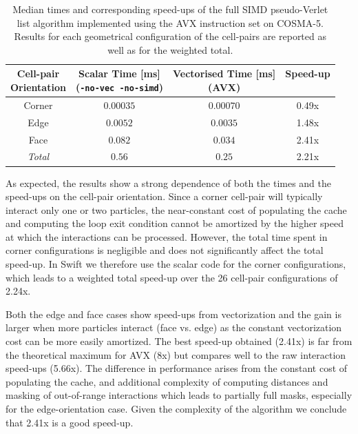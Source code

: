 \documentclass{IOS-Book-Article}
\newcommand{\swift}{{\sc Swift}\xspace}
\begin{document}
\begin{table}[h]
  \caption{Median times and corresponding speed-ups of the full SIMD pseudo-Verlet list algorithm implemented using the AVX instruction set on COSMA-5. Results for each geometrical configuration of the cell-pairs are reported as well as for the weighted total.}
  \label{table:cell_orientation_results}
  \centering
  \begin{tabular}{ cccc } 
    \hline
    \hline
    \makecell{Cell-pair \\ Orientation} & \makecell{Scalar Time [ms] \\ (\texttt{-no-vec -no-simd})} & \makecell{Vectorised Time [ms] \\ (AVX)} & \makecell{Speed-up\\~} \\ 
    \hline
    Corner 	    & $0.00035$ & $0.00070$ & 0.49x   \\
    Edge    	& $0.0052$ & $0.0035$ & 1.48x   \\ 
    Face  		& $0.082$ & $0.034$ & 2.41x  \\ 
    \hline
    {\em Total} & $0.56$ & $0.25$ & 2.21x  \\
    \hline
    \hline
  \end{tabular}
\end{table}

As expected, the results show a strong dependence of both the times and the speed-ups on the cell-pair orientation. Since a corner cell-pair will typically interact only one or two particles, the near-constant cost of populating the cache and computing the loop exit condition cannot be amortized by the higher speed at which the interactions can be processed. However, the total time spent in corner configurations is negligible and does not significantly affect the total speed-up. In \swift we therefore use the scalar code for the corner configurations, which leads to a weighted total speed-up over the 26 cell-pair configurations of 2.24x. 

Both the edge and face cases show speed-ups from vectorization and the gain is larger when more particles interact (face vs. edge) as the constant vectorization cost can be more easily amortized. The best speed-up obtained (2.41x) is far from the theoretical maximum for AVX (8x) but compares well to the raw interaction speed-ups (5.66x). The difference in performance arises from the constant cost of populating the cache, and additional complexity of computing distances and masking of out-of-range interactions which leads to partially full masks, especially for the edge-orientation case. Given the complexity of the algorithm we conclude that 2.41x is a good speed-up.
\end{document}
